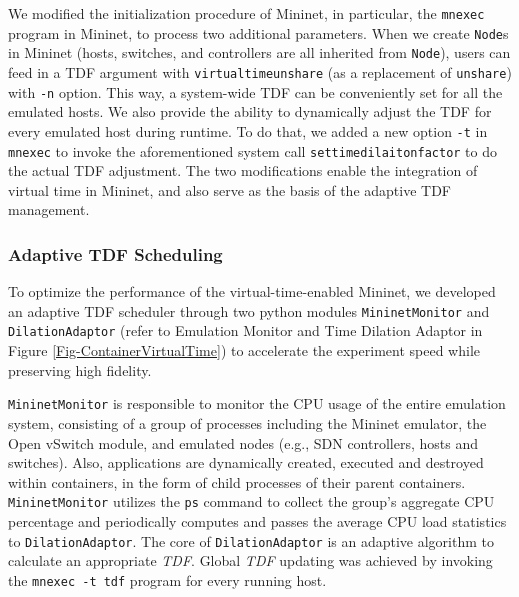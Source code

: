 We modified the initialization procedure of Mininet, in particular, the \texttt{mnexec} program in Mininet, to process two additional parameters. 
When we create \texttt{Node}s in Mininet (hosts, switches, and controllers are all inherited from \texttt{Node}), users can feed in a TDF argument with \texttt{virtualtimeunshare} (as a replacement of \texttt{unshare}) with \texttt{-n} option. 
This way, a system-wide TDF can be conveniently set for all the emulated hosts. We also provide the ability to dynamically adjust the TDF for every emulated host during runtime. 
To do that, we added a new option \texttt{-t} in \texttt{mnexec} to invoke the aforementioned system call \texttt{settimedilaitonfactor} to do the actual TDF adjustment. 
The two modifications enable the integration of virtual time in Mininet, and also serve as the basis of the adaptive TDF management.

\subsubsection{Adaptive TDF Scheduling}
To optimize the performance of the virtual-time-enabled Mininet, we developed an adaptive TDF scheduler through two python modules \texttt{MininetMonitor} and \texttt{DilationAdaptor} (refer to Emulation Monitor and Time Dilation Adaptor in Figure \ref{Fig-ContainerVirtualTime}) to accelerate the experiment speed while preserving high fidelity.

\texttt{MininetMonitor} is responsible to monitor the CPU usage of the entire emulation system, consisting of a group of processes including the Mininet emulator, the Open vSwitch module, and emulated nodes (e.g., SDN controllers, hosts and switches). 
Also, applications are dynamically created, executed and destroyed within containers, in the form of child processes of their parent containers. 
\texttt{MininetMonitor} utilizes the \texttt{ps} command to collect the group's aggregate CPU percentage and periodically computes and passes the average CPU load statistics to \texttt{DilationAdaptor}. 
The core of \texttt{DilationAdaptor} is an adaptive algorithm to calculate an appropriate \textit{TDF}. %
Global \textit{TDF} updating was achieved by invoking the \texttt{mnexec\ -t\ tdf} program for every running host. 



